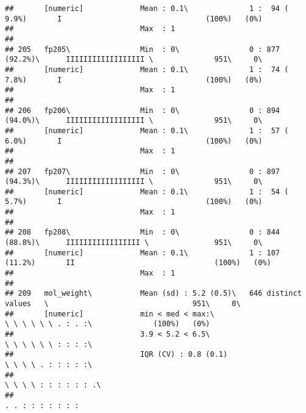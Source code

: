 \documentclass[]{article}
\begin{document}
\begin{verbatim}
##       [numeric]             Mean : 0.1\              1 :  94 ( 9.9%)       I                                 (100%)   (0%)     
##                             Max  : 1                                                                                           
## 
## 205   fp205\                Min  : 0\                0 : 877 (92.2%)\      IIIIIIIIIIIIIIIIII \              951\     0\       
##       [numeric]             Mean : 0.1\              1 :  74 ( 7.8%)       I                                 (100%)   (0%)     
##                             Max  : 1                                                                                           
## 
## 206   fp206\                Min  : 0\                0 : 894 (94.0%)\      IIIIIIIIIIIIIIIIII \              951\     0\       
##       [numeric]             Mean : 0.1\              1 :  57 ( 6.0%)       I                                 (100%)   (0%)     
##                             Max  : 1                                                                                           
## 
## 207   fp207\                Min  : 0\                0 : 897 (94.3%)\      IIIIIIIIIIIIIIIIII \              951\     0\       
##       [numeric]             Mean : 0.1\              1 :  54 ( 5.7%)       I                                 (100%)   (0%)     
##                             Max  : 1                                                                                           
## 
## 208   fp208\                Min  : 0\                0 : 844 (88.8%)\      IIIIIIIIIIIIIIIII \               951\     0\       
##       [numeric]             Mean : 0.1\              1 : 107 (11.2%)       II                                (100%)   (0%)     
##                             Max  : 1                                                                                           
## 
## 209   mol_weight\           Mean (sd) : 5.2 (0.5)\   646 distinct values   \                                 951\     0\       
##       [numeric]             min < med < max:\                              \ \ \ \ \ \ . : . :\              (100%)   (0%)     
##                             3.9 < 5.2 < 6.5\                               \ \ \ \ \ \ : : : :\                                
##                             IQR (CV) : 0.8 (0.1)                           \ \ \ \ . : : : : :\                                
##                                                                            \ \ \ \ : : : : : : .\                              
##                                                                            . . : : : : : : :                                   

\end{verbatim}
\end{document}
